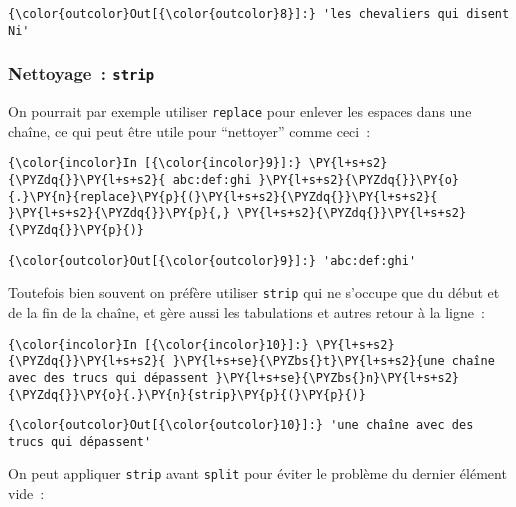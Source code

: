 \begin{Verbatim}[commandchars=\\\{\}]
{\color{outcolor}Out[{\color{outcolor}8}]:} 'les chevaliers qui disent Ni'
\end{Verbatim}
            
    \hypertarget{nettoyage-strip}{%
\subsubsection{\texorpdfstring{Nettoyage~:
\texttt{strip}}{Nettoyage~: strip}}\label{nettoyage-strip}}

    On pourrait par exemple utiliser \texttt{replace} pour enlever les
espaces dans une chaîne, ce qui peut être utile pour ``nettoyer'' comme
ceci~:

    \begin{Verbatim}[commandchars=\\\{\}]
{\color{incolor}In [{\color{incolor}9}]:} \PY{l+s+s2}{\PYZdq{}}\PY{l+s+s2}{ abc:def:ghi }\PY{l+s+s2}{\PYZdq{}}\PY{o}{.}\PY{n}{replace}\PY{p}{(}\PY{l+s+s2}{\PYZdq{}}\PY{l+s+s2}{ }\PY{l+s+s2}{\PYZdq{}}\PY{p}{,} \PY{l+s+s2}{\PYZdq{}}\PY{l+s+s2}{\PYZdq{}}\PY{p}{)}
\end{Verbatim}


\begin{Verbatim}[commandchars=\\\{\}]
{\color{outcolor}Out[{\color{outcolor}9}]:} 'abc:def:ghi'
\end{Verbatim}
            
    Toutefois bien souvent on préfère utiliser \texttt{strip} qui ne
s'occupe que du début et de la fin de la chaîne, et gère aussi les
tabulations et autres retour à la ligne~:

    \begin{Verbatim}[commandchars=\\\{\}]
{\color{incolor}In [{\color{incolor}10}]:} \PY{l+s+s2}{\PYZdq{}}\PY{l+s+s2}{ }\PY{l+s+se}{\PYZbs{}t}\PY{l+s+s2}{une chaîne avec des trucs qui dépassent }\PY{l+s+se}{\PYZbs{}n}\PY{l+s+s2}{\PYZdq{}}\PY{o}{.}\PY{n}{strip}\PY{p}{(}\PY{p}{)}
\end{Verbatim}


\begin{Verbatim}[commandchars=\\\{\}]
{\color{outcolor}Out[{\color{outcolor}10}]:} 'une chaîne avec des trucs qui dépassent'
\end{Verbatim}
            
    On peut appliquer \texttt{strip} avant \texttt{split} pour éviter le
problème du dernier élément vide~:

